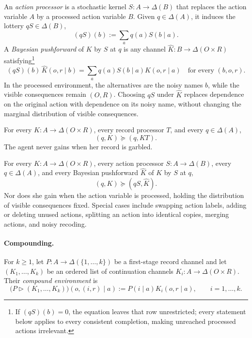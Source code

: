 \documentclass[11pt,a4paper]{article}
\theoremstyle{definition}
\newcommand{\D}{\Delta}
\newcommand{\1}{\mathbf 1}
\begin{document}
An \emph{action processor} is a stochastic kernel $S:A\to\D(B)$ that replaces the action variable $A$ by a
processed action variable $B$.  Given $q\in\D(A)$, it induces the lottery $qS\in\D(B)$,
\[
 (qS)(b):=\sum_aq(a)S(b\mid a).
\]
A \emph{Bayesian pushforward} of $K$ by $S$ at $q$ is any channel $\widehat K:B\to\D(O\times R)$
satisfying\footnote{If $(qS)(b)=0$, the
equation leaves that row unrestricted; every statement below applies to every consistent completion, making
unreached processed actions irrelevant.}
\begin{equation}
 (qS)(b)\,\widehat K(o,r\mid b)
 =\sum_a q(a)S(b\mid a)K(o,r\mid a)
 \quad\text{for every }(b,o,r).
 \label{eq:action-processing}
\end{equation}
In the processed environment, the alternatives are the noisy names $b$, while the visible consequences remain
$(O,R)$.  Choosing $qS$ under $\widehat K$ replaces dependence on the original action with dependence on its
noisy name, without changing the marginal distribution of visible consequences.

\begin{description}[leftmargin=*,style=sameline]

\item[(A6) Record data processing.]
For every $K:A\to\D(O\times R)$, every record processor $T$, and every $q\in\D(A)$,
\[
 (q,K)\succeq(q,KT).
\]
The agent never gains when her record is garbled.

\item[(A7) Action data processing.]
For every $K:A\to\D(O\times R)$, every action processor $S:A\to\D(B)$, every $q\in\D(A)$, and every Bayesian
pushforward $\widehat K$ of $K$ by $S$ at $q$,
\[
 (q,K)\succeq(qS,\widehat K).
\]
Nor does she gain when the action variable is processed, holding the distribution of visible consequences fixed. Special cases include swapping action labels, adding or deleting unused actions, splitting an action into identical copies, merging actions, and noisy recoding.
\end{description}

\paragraph{Compounding.}
For $k\ge1$, let $P:A\to\D(\{1,\ldots,k\})$ be a first-stage record channel and let
$(K_1,\ldots,K_k)$ be an ordered list of continuation channels $K_i:A\to\D(O\times R)$.  Their
\emph{compound environment} is
\begin{equation}
 \bigl(P\triangleright(K_1,\ldots,K_k)\bigr)(o,(i,r)\mid a)
 :=P(i\mid a)K_i(o,r\mid a),
 \qquad i=1,\ldots,k.
 \label{eq:compound}
\end{equation}
\end{document}
